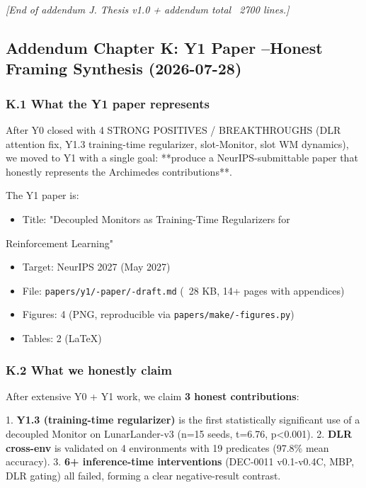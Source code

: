 \documentclass[11pt]{article}
\begin{document}
\hrulefill

\textit{[End of addendum J. Thesis v1.0 + addendum total ~2700 lines.]}


\hrulefill

\subsection{Addendum Chapter K: Y1 Paper --Honest Framing Synthesis (2026-07-28)}

\subsubsection{K.1 What the Y1 paper represents}

After Y0 closed with 4 STRONG POSITIVES / BREAKTHROUGHS (DLR attention fix,
Y1.3 training-time regularizer, slot-Monitor, slot WM dynamics), we
moved to Y1 with a single goal: **produce a NeurIPS-submittable paper
that honestly represents the Archimedes contributions**.

The Y1 paper is:
\begin{itemize}
  \item Title: "Decoupled Monitors as Training-Time Regularizers for
\end{itemize}

  Reinforcement Learning"
\begin{itemize}
  \item Target: NeurIPS 2027 (May 2027)
  \item File: \texttt{papers/y1/-paper/-draft.md} (~28 KB, 14+ pages with appendices)
  \item Figures: 4 (PNG, reproducible via \texttt{papers/make/-figures.py})
  \item Tables: 2 (LaTeX)
\end{itemize}


\subsubsection{K.2 What we honestly claim}

After extensive Y0 + Y1 work, we claim \textbf{3 honest contributions}:

1. \textbf{Y1.3 (training-time regularizer)} is the first statistically
   significant use of a decoupled Monitor on LunarLander-v3
   (n=15 seeds, t=6.76, p<0.001).
2. \textbf{DLR cross-env} is validated on 4 environments with 19 predicates
   (97.8\% mean accuracy).
3. \textbf{6+ inference-time interventions} (DEC-0011 v0.1-v0.4C, MBP, DLR gating)
   all failed, forming a clear negative-result contrast.
\end{document}
